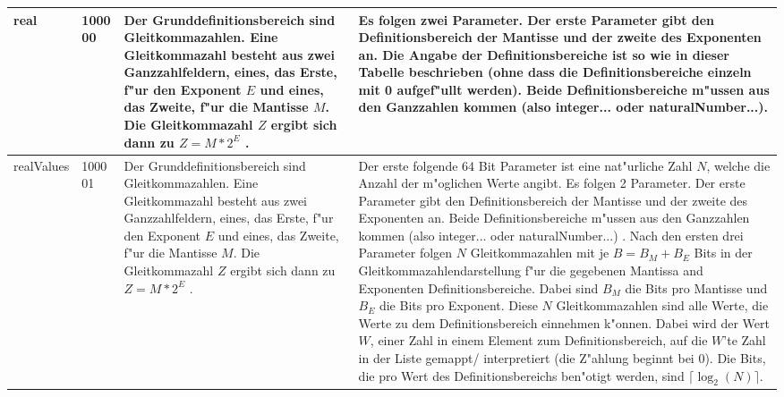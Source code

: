 \begin{center}
\begin{longtable}{|p{25mm}|p{15mm}|p{25mm}|p{60mm}|}

	real & 1000 00 & Der Grunddefinitionsbereich sind Gleitkommazahlen. Eine Gleitkommazahl besteht aus zwei Ganzzahlfeldern, eines, das Erste, f"ur den Exponent $E$ und eines, das Zweite, f"ur die Mantisse $M$. Die Gleitkommazahl $Z$ ergibt sich dann zu $Z=M*2^E$ . & Es folgen zwei Parameter. Der erste Parameter gibt den Definitionsbereich der Mantisse und der zweite des Exponenten an. Die Angabe der Definitionsbereiche ist so wie in dieser Tabelle beschrieben (ohne dass die Definitionsbereiche einzeln mit 0 aufgef"ullt werden). Beide Definitionsbereiche m"ussen aus den Ganzzahlen kommen (also integer... oder naturalNumber...).\\\hline
	realValues & 1000 01 & Der Grunddefinitionsbereich sind Gleitkommazahlen. Eine Gleitkommazahl besteht aus zwei Ganzzahlfeldern, eines, das Erste, f"ur den Exponent $E$ und eines, das Zweite, f"ur die Mantisse $M$. Die Gleitkommazahl $Z$ ergibt sich dann zu $Z=M*2^E$ . & Der erste folgende 64 Bit Parameter ist eine nat"urliche Zahl $N$, welche die Anzahl der m"oglichen Werte angibt. Es folgen 2 Parameter. Der erste Parameter gibt den Definitionsbereich der Mantisse und der zweite des Exponenten an. Beide Definitionsbereiche m"ussen aus den Ganzzahlen kommen (also integer... oder naturalNumber...) . Nach den ersten drei Parameter folgen $N$ Gleitkommazahlen mit je $B=B_M+B_E$ Bits in der Gleitkommazahlendarstellung f"ur die gegebenen Mantissa and Exponenten Definitionsbereiche. Dabei sind $B_M$ die Bits pro Mantisse und $B_E$ die Bits pro Exponent. Diese $N$ Gleitkommazahlen sind alle Werte, die Werte zu dem Definitionsbereich einnehmen k"onnen. Dabei wird der Wert $W$, einer Zahl in einem Element zum Definitionsbereich, auf die $W$'te Zahl in der Liste gemappt/ interpretiert (die Z"ahlung beginnt bei 0). Die Bits, die pro Wert des Definitionsbereichs ben"otigt werden, sind $\lceil \log_2(N) \rceil $.\\\hline


\end{longtable}
\end{center}
